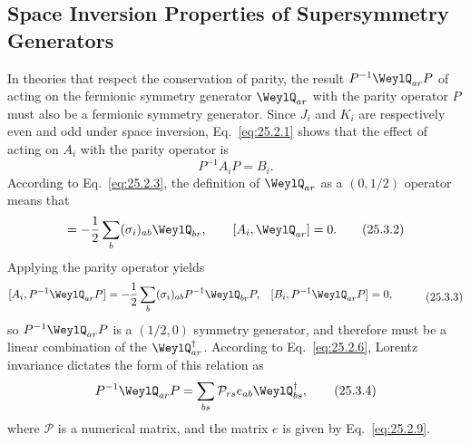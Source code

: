 \subsection{Space Inversion Properties of Supersymmetry Generators}

In theories that respect the conservation of parity, the result
\(P^{-1}\WeylQ_{ar}P\) of acting on the fermionic symmetry generator
\(\WeylQ_{ar}\) with the parity operator \(P\) must also be a fermionic
symmetry generator. Since \(J_i\) and \(K_i\) are respectively even and odd
under space inversion, Eq.~\eqref{eq:25.2.1} shows that the effect of acting
on \(A_i\) with the parity operator is
\begin{equation}
P^{-1}A_iP=B_i.
\tag{25.3.1}\label{eq:25.3.1}
\end{equation}
According to Eq.~\eqref{eq:25.2.3}, the definition of \(\WeylQ_{ar}\) as a
\((0,1/2)\) operator means that
\begin{equation}
[B_i,\WeylQ_{ar}]
=-\frac12\sum_b(\sigma_i)_{ab}\WeylQ_{br},
\qquad
[A_i,\WeylQ_{ar}]=0.
\tag{25.3.2}\label{eq:25.3.2}
\end{equation}
Applying the parity operator yields
\begin{equation}
\begin{aligned}
[A_i,P^{-1}\WeylQ_{ar}P]
&=-\frac12\sum_b(\sigma_i)_{ab}P^{-1}\WeylQ_{br}P,
&
[B_i,P^{-1}\WeylQ_{ar}P]&=0,
\end{aligned}
\tag{25.3.3}\label{eq:25.3.3}
\end{equation}
so \(P^{-1}\WeylQ_{ar}P\) is a \((1/2,0)\) symmetry generator, and therefore
must be a linear combination of the \(\WeylQ_{ar}^{\dagger}\). According to
Eq.~\eqref{eq:25.2.6}, Lorentz invariance dictates the form of this relation
as
\begin{equation}
P^{-1}\WeylQ_{ar}P
=\sum_{bs}\mathcal P_{rs}e_{ab}\WeylQ_{bs}^{\dagger},
\tag{25.3.4}\label{eq:25.3.4}
\end{equation}
where \(\mathcal P\) is a numerical matrix, and the matrix \(e\) is given by
Eq.~\eqref{eq:25.2.9}.


